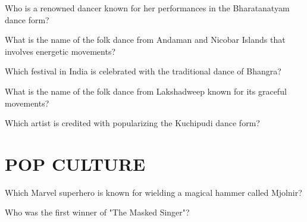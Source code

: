 \documentclass[12pt,a4paper]{book}
\begin{document}
\begin{enhancedmcq}[Question 46]{Who is a renowned dancer known for her performances in the Bharatanatyam dance form?}
\end{enhancedmcq}

\begin{enhancedmcq}[Question 47]{What is the name of the folk dance from Andaman and Nicobar Islands that involves energetic movements?}
\end{enhancedmcq}

\begin{enhancedmcq}[Question 48]{Which festival in India is celebrated with the traditional dance of Bhangra?}
\end{enhancedmcq}

\begin{enhancedmcq}[Question 49]{What is the name of the folk dance from Lakshadweep known for its graceful movements?}
\end{enhancedmcq}

\begin{enhancedmcq}[Question 50]{Which artist is credited with popularizing the Kuchipudi dance form?}
\end{enhancedmcq}


\section{POP CULTURE}

\begin{enhancedmcq}[Question 1]{Which Marvel superhero is known for wielding a magical hammer called Mjolnir?}
\end{enhancedmcq}

\begin{enhancedmcq}[Question 2]{Who was the first winner of "The Masked Singer"?}
\end{enhancedmcq}
\end{document}
